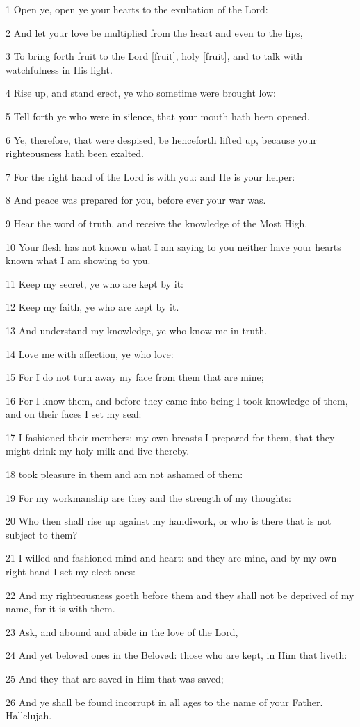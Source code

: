 \par 1 Open ye, open ye your hearts to the exultation of the Lord:
\par 2 And let your love be multiplied from the heart and even to the lips,
\par 3 To bring forth fruit to the Lord [fruit], holy [fruit], and to talk with watchfulness in His light.
\par 4 Rise up, and stand erect, ye who sometime were brought low:
\par 5 Tell forth ye who were in silence, that your mouth hath been opened.
\par 6 Ye, therefore, that were despised, be henceforth lifted up, because your righteousness hath been exalted.
\par 7 For the right hand of the Lord is with you: and He is your helper:
\par 8 And peace was prepared for you, before ever your war was.
\par 9 Hear the word of truth, and receive the knowledge of the Most High.
\par 10 Your flesh has not known what I am saying to you neither have your hearts known what I am showing to you.
\par 11 Keep my secret, ye who are kept by it:
\par 12 Keep my faith, ye who are kept by it.
\par 13 And understand my knowledge, ye who know me in truth.
\par 14 Love me with affection, ye who love:
\par 15 For I do not turn away my face from them that are mine;
\par 16 For I know them, and before they came into being I took knowledge of them, and on their faces I set my seal:
\par 17 I fashioned their members: my own breasts I prepared for them, that they might drink my holy milk and live thereby.
\par 18 took pleasure in them and am not ashamed of them:
\par 19 For my workmanship are they and the strength of my thoughts:
\par 20 Who then shall rise up against my handiwork, or who is there that is not subject to them?
\par 21 I willed and fashioned mind and heart: and they are mine, and by my own right hand I set my elect ones:
\par 22 And my righteousness goeth before them and they shall not be deprived of my name, for it is with them.
\par 23 Ask, and abound and abide in the love of the Lord,
\par 24 And yet beloved ones in the Beloved: those who are kept, in Him that liveth:
\par 25 And they that are saved in Him that was saved;
\par 26 And ye shall be found incorrupt in all ages to the name of your Father. Hallelujah.

